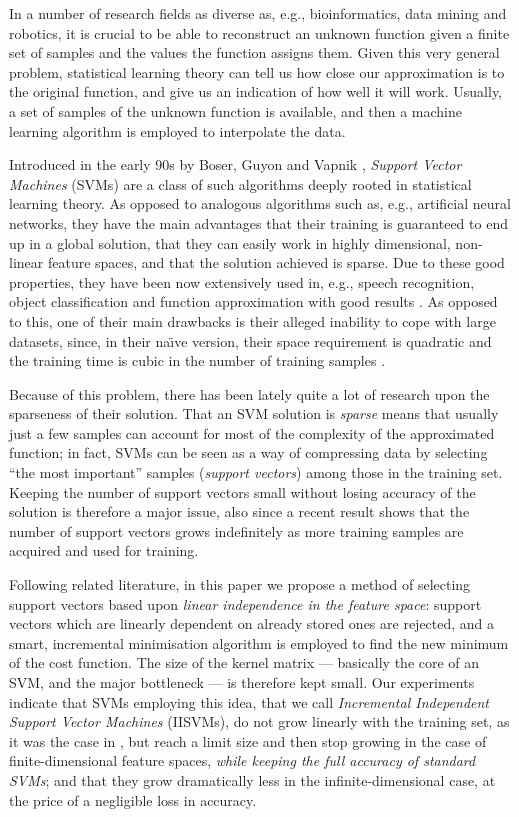 In a number of research fields as diverse as, e.g., bioinformatics,
data mining and robotics, it is crucial to be able to reconstruct an
unknown function given a finite set of samples and the values the
function assigns them. Given this very general problem, statistical
learning theory \cite{v-edbed-82} can tell us how close our
approximation is to the original function, and give us an indication
of how well it will work. Usually, a set of samples of the unknown
function is available, and then a machine learning algorithm is
employed to interpolate the data.

Introduced in the early 90s by Boser, Guyon and Vapnik \cite{BGV92},
\emph{Support Vector Machines} (SVMs) are a class of such algorithms
deeply rooted in statistical learning theory. As opposed to analogous
algorithms such as, e.g., artificial neural networks, they have the
main advantages that their training is guaranteed to end up in a
global solution, that they can easily work in highly dimensional,
non-linear feature spaces, and that the solution achieved is
sparse. Due to these good properties, they have been now extensively
used in, e.g., speech recognition, object classification and function
approximation with good results \cite{Cristianini00}. As opposed to
this, one of their main drawbacks is their alleged inability to cope
with large datasets, since, in their na\"\i ve version, their space
requirement is quadratic and the training time is cubic in the number
of training samples \cite{KeerthiCDC06}.

Because of this problem, there has been lately quite a lot of research
upon the sparseness of their solution. That an SVM solution is
\emph{sparse} means that usually just a few samples can account for
most of the complexity of the approximated function; in fact, SVMs can
be seen as a way of compressing data by selecting ``the most
important'' samples (\emph{support vectors}) among those in the
training set. Keeping the number of support vectors small without
losing accuracy of the solution is therefore a major issue, also since
a recent result \cite{Steinwart03} shows that the number of support
vectors grows indefinitely as more training samples are acquired and
used for training.

Following related literature, in this paper we propose a method of
selecting support vectors based upon \emph{linear independence in the
feature space}: support vectors which are linearly dependent on
already stored ones are rejected, and a smart, incremental
minimisation algorithm is employed to find the new minimum of the cost
function. The size of the kernel matrix --- basically the core of an
SVM, and the major bottleneck --- is therefore kept small. Our
experiments indicate that SVMs employing this idea, that we call
\emph{Incremental Independent Support Vector Machines} (IISVMs), do
not grow linearly with the training set, as it was the case in
\cite{Steinwart03}, but reach a limit size and then stop growing in
the case of finite-dimensional feature spaces, \emph{while keeping the
full accuracy of standard SVMs}; and that they grow dramatically less
in the infinite-dimensional case, at the price of a negligible loss in
accuracy.

